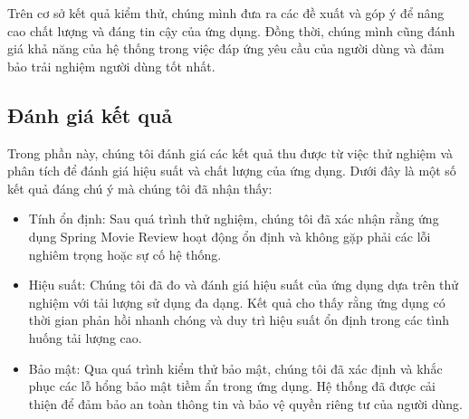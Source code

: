 \documentclass[12pt]{article}
\begin{document}
Trên cơ sở kết quả kiểm thử, chúng mình đưa ra các đề xuất và góp ý để nâng cao chất lượng và đáng tin cậy của ứng dụng. Đồng thời, chúng mình cũng đánh giá khả năng của hệ thống trong việc đáp ứng yêu cầu của người dùng và đảm bảo trải nghiệm người dùng tốt nhất.
\subsection{Đánh giá kết quả}
Trong phần này, chúng tôi đánh giá các kết quả thu được từ việc thử nghiệm và phân tích để đánh giá hiệu suất và chất lượng của ứng dụng. Dưới đây là một số kết quả đáng chú ý mà chúng tôi đã nhận thấy:
\begin{itemize}
    \item Tính ổn định: Sau quá trình thử nghiệm, chúng tôi đã xác nhận rằng ứng dụng Spring Movie Review hoạt động ổn định và không gặp phải các lỗi nghiêm trọng hoặc sự cố hệ thống.

    \item Hiệu suất: Chúng tôi đã đo và đánh giá hiệu suất của ứng dụng dựa trên thử nghiệm với tải lượng sử dụng đa dạng. Kết quả cho thấy rằng ứng dụng có thời gian phản hồi nhanh chóng và duy trì hiệu suất ổn định trong các tình huống tải lượng cao.

    \item Bảo mật: Qua quá trình kiểm thử bảo mật, chúng tôi đã xác định và khắc phục các lỗ hổng bảo mật tiềm ẩn trong ứng dụng. Hệ thống đã được cải thiện để đảm bảo an toàn thông tin và bảo vệ quyền riêng tư của người dùng.


\end{itemize}
\end{document}
